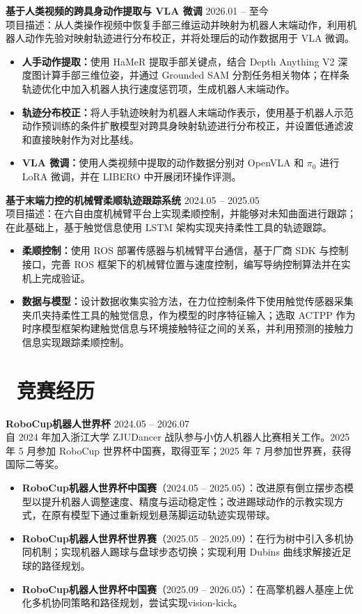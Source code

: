 \documentclass[11pt]{article}
\newlength{\intraProjectTitleSep}
\newcommand{\titlebreak}{\\[\intraProjectTitleSep]}
\newlength{\intraProjectListTopSep}
\begin{document}
\textbf{基于人类视频的跨具身动作提取与 VLA 微调}
\hfill 2026.01 -- 至今 \titlebreak
项目描述：从人类操作视频中恢复手部三维运动并映射为机器人末端动作，利用机器人动作先验对映射轨迹进行分布校正，并将处理后的动作数据用于 VLA 微调。
\begin{itemize}[nosep, topsep=\intraProjectListTopSep]
    \item \textbf{人手动作提取：}使用 HaMeR 提取手部关键点，结合 Depth Anything V2 深度图计算手部三维位姿，并通过 Grounded SAM 分割任务相关物体；在样条轨迹优化中加入机器人执行速度惩罚项，生成机器人末端动作。
    \item \textbf{轨迹分布校正：}将人手轨迹映射为机器人末端动作表示，使用基于机器人示范动作预训练的条件扩散模型对跨具身映射轨迹进行分布校正，并设置低通滤波和直接映射作为对比基线。
    \item \textbf{VLA 微调：}使用人类视频中提取的动作数据分别对 OpenVLA 和 $\pi_0$ 进行 LoRA 微调，并在 LIBERO 中开展闭环操作评测。
\end{itemize}

\textbf{基于末端力控的机械臂柔顺轨迹跟踪系统} \hfill 2024.05 -- 2025.05 \titlebreak
项目描述：在六自由度机械臂平台上实现柔顺控制，并能够对未知曲面进行跟踪；在此基础上，基于触觉信息使用 LSTM 架构实现夹持柔性工具的轨迹跟踪。
\begin{itemize}[nosep, topsep=\intraProjectListTopSep]
    \item \textbf{柔顺控制：}使用 ROS 部署传感器与机械臂平台通信，基于厂商 SDK 与控制接口，完善 ROS 框架下的机械臂位置与速度控制，编写导纳控制算法并在实机上完成验证。
    \item \textbf{数据与模型：}设计数据收集实验方法，在力位控制条件下使用触觉传感器采集夹爪夹持柔性工具的触觉信息，作为模型的时序特征输入；选取 ACTPP 作为时序模型框架构建触觉信息与环境接触特征之间的关系，并利用预测的接触力信息实现跟踪柔顺控制。
\end{itemize}

\section{\makebox[\widthof{\faTrophy}][c]{\color{CVBlue}\faTrophy}\ 竞赛经历}
\textbf{RoboCup机器人世界杯} \hfill 2024.05 -- 2026.07 \titlebreak
自 2024 年加入浙江大学 ZJUDancer 战队参与小仿人机器人比赛相关工作。2025 年 5 月参加 RoboCup 世界杯中国赛，取得亚军；2025 年 7 月参加世界赛，获得国际二等奖。
\begin{itemize}[nosep, topsep=\intraProjectListTopSep]
    \item \textbf{RoboCup机器人世界杯中国赛}（2024.05 -- 2025.05）：改进原有倒立摆步态模型以提升机器人调整速度、精度与运动稳定性；改进踢球动作的示教实现方式，在原有模型下通过重新规划悬荡脚运动轨迹实现带球。
    \item \textbf{RoboCup机器人世界杯世界赛}（2025.05 -- 2025.09）：在行为树中引入多机协同机制；实现机器人踢球与盘球步态切换；实现利用 Dubins 曲线求解接近足球的路径规划。
    \item \textbf{RoboCup机器人世界杯中国赛}（2025.09 -- 2026.05）：在高擎机器人基座上优化多机协同策略和路径规划，尝试实现vision-kick。
\end{itemize}
\end{document}
